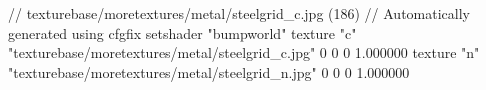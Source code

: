 // texturebase/moretextures/metal/steelgrid_c.jpg (186)
// Automatically generated using cfgfix
setshader "bumpworld"
texture "c" "texturebase/moretextures/metal/steelgrid_c.jpg" 0 0 0 1.000000
texture "n" "texturebase/moretextures/metal/steelgrid_n.jpg" 0 0 0 1.000000
